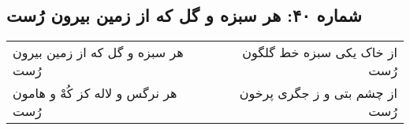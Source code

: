 \begin{center}
\section*{شماره ۴۰: هر سبزه و گل که از زمین بیرون رُست}
\label{sec:040}
\begin{longtable}{l p{0.5cm} r}
هر سبزه و گل که از زمین بیرون رُست
&&
از خاک یکی سبزه خط گلگون رُست
\\
هر نرگس و لاله کز کُهْ و هامون رُست
&&
از چشم بتی و ز جگری پرخون رُست
\\
\end{longtable}
\end{center}
